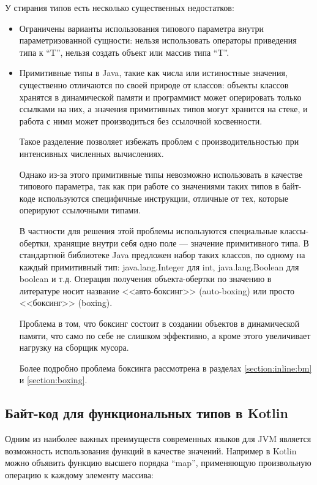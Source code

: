 У стирания типов есть несколько существенных недостатков:
\begin{itemize}
    \item Ограничены варианты использования типового параметра внутри параметризованной сущности:
    нельзя использовать операторы приведения типа к ``T'', нельзя создать объект или массив
    типа ``T''.
    \item Примитивные типы в Java, такие как числа или истиностные значения, существенно отличаются
    по своей природе от классов: объекты классов хранятся в динамической памяти и программист
    может оперировать только ссылками на них, а значения примитивных типов могут хранится на стеке,
    и работа с ними может производиться без ссылочной косвенности.

    Такое разделение позволяет избежать проблем с производительностью при интенсивных численных
    вычислениях.

    Однако из-за этого примитивные типы невозможно использовать в качестве типового параметра,
    так как при работе со значениями таких типов в байт-коде используются специфичные инструкции,
    отличные от тех, которые оперируют ссылочными типами.

    В частности для решения этой проблемы используются специальные классы-обертки, хранящие внутри
    себя одно поле --- значение примитивного типа. В стандартной библиотеке Java предложен набор
    таких классов, по одному на каждый примитивный тип: java.lang.Integer для int,
    java.lang.Boolean для boolean и т.д. Операция получения объекта-обертки по значению
    в литературе носит название <<авто-боксинг>> (auto-boxing) или просто <<боксинг>> (boxing).

    Проблема в том, что боксинг состоит в создании объектов в динамической памяти, что само по себе
    не слишком эффективно, а кроме этого увеличивает нагрузку на сборщик мусора.

    Более подробно проблема боксинга рассмотрена в разделах \ref{section:inline:bm} и \ref{section:boxing}.
\end{itemize}

\subsection{Байт-код для функциональных типов в Kotlin}
\label{section:lambda}
Одним из наиболее важных преимуществ современных языков для JVM является возможность использования
функций в качестве значений.
Например в Kotlin можно объявить функцию высшего порядка ``map'', применяющую произвольную операцию
к каждому элементу массива:

